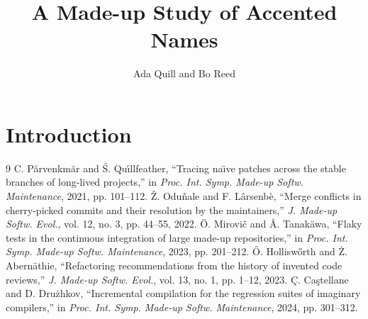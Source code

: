 \documentclass[conference]{IEEEtran}
\begin{document}
\title{A Made-up Study of Accented Names}
\author{Ada Quill and Bo Reed}
\maketitle
\begin{abstract}
\lipsum[1][1-3]
\end{abstract}
\section{Introduction}
\lipsum[2][1-4]

\begin{thebibliography}{9}
 C. P{\u{a}}rvenkm{\u{a}}r and {\'S}. Qu{\'\i}llfeather, ``Tracing na{\"\i}ve patches across the stable
branches of long-lived projects,'' in \emph{Proc. Int. Symp. Made-up Softw. Maintenance}, 2021, pp. 101--112.
 {\v{Z}}. Odu{\~n}ale and F. L{\^a}rsenb{\`e}, ``Merge conflicts in cherry-picked commits and their
resolution by the maintainers,'' \emph{J. Made-up Softw. Evol.}, vol. 12, no. 3, pp. 44--55, 2022.
 {\"O}. Mirovi{\v{c}} and {\AA}. Tanak{\"a}wa, ``Flaky tests in the continuous integration of large
made-up repositories,'' in \emph{Proc. Int. Symp. Made-up Softw. Maintenance}, 2023, pp. 201--212.
 {\H{O}}. Hollisw{\H{o}}rth and {\.Z}. Abern{\=a}thie, ``Refactoring recommendations from the history of
invented code reviews,'' \emph{J. Made-up Softw. Evol.}, vol. 13, no. 1, pp. 1--12, 2023.
 {\c{C}}. Ca{\c{s}}tellane and D. Dru{\.z}hkov, ``Incremental compilation for the regression suites of
imaginary compilers,'' in \emph{Proc. Int. Symp. Made-up Softw. Maintenance}, 2024, pp. 301--312.
\end{thebibliography}
\end{document}
